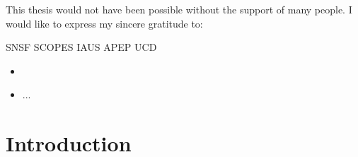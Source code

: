 \documentclass[11pt]{report}
\begin{document}
This thesis would not have been possible without the support of many people. I would like to express my sincere gratitude to:

SNSF
SCOPES
IAUS
APEP UCD

\begin{itemize}
\item 
\item ...
\end{itemize}




\chapter{Introduction}
\end{document}
